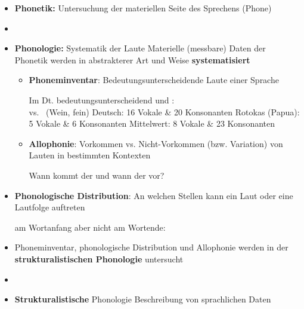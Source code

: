 \begin{frame}

\begin{itemize}
	\item \textbf{Phonetik:} Untersuchung der materiellen Seite des Sprechens (Phone)
	\item[]
	\item \textbf{Phonologie:} Systematik der Laute \ras Materielle (messbare) Daten der Phonetik werden in abstrakterer Art und Weise \textbf{systematisiert}
	
	\begin{itemize}
		\item \textbf{Phoneminventar}: Bedeutungsunterscheidende Laute einer Sprache 

	\eal		
		\ex Im Dt. bedeutungsunterscheidend \textipa{[v]} und \textipa{[f]}: \\
		\textipa{[v\t{aI}n]} vs.\ \textipa{[f\t{aI}n]} (Wein, fein)
		\ex Deutsch: 16 Vokale \& 20 Konsonanten
		\ex Rotokas (Papua): 5 Vokale \& 6 Konsonanten
		\ex Mittelwert:  8 Vokale \& 23 Konsonanten
	\zl
	
		\item \textbf{Allophonie}: Vorkommen vs. Nicht-Vorkommen (bzw. Variation) von Lauten in bestimmten Kontexten

		\ea Wann kommt der  und wann der  vor?
		\z

	\end{itemize}
	
\end{itemize}
		
\end{frame}


\begin{frame}

\begin{itemize}
	\item \textbf{Phonologische Distribution}: An welchen Stellen kann ein Laut oder eine Lautfolge auftreten

	\ea \textipa{[St\textscr]} am Wortanfang aber nicht am Wortende:\\
	\textipa{[St{\textscr}\t{aU}x]} \vs *
	\z

	\item Phoneminventar, phonologische Distribution und Allophonie werden in der \textbf{strukturalistischen Phonologie} untersucht
	\item[]
	\item \textbf{Strukturalistische} Phonologie \ras Beschreibung von sprachlichen Daten 

\end{itemize}

\end{frame}


